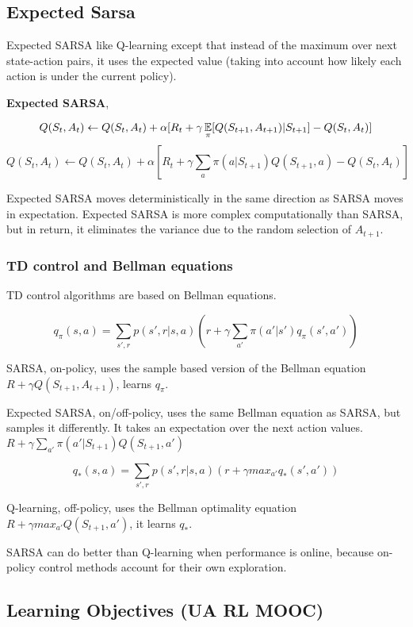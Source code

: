 \documentclass[sutton_barto_notes.tex]{subfiles}
\begin{document}
\subsection{Expected Sarsa}

Expected SARSA like Q-learning except that instead of the maximum over next state-action pairs, it uses the expected value (taking into account how likely each action is under the current policy).

\begin{definition}
\textbf{Expected SARSA},

$$Q(S_t, A_t)\leftarrow Q(S_t, A_t) + \alpha [R_t + \gamma \operatorname*{\mathbb{E}}_\pi [Q(S_{t+1}, A_{t+1})|S_{t+1}] - Q(S_t, A_t)]$$
$$Q(S_t, A_t)\leftarrow Q(S_t, A_t) + \alpha [R_t + \gamma \sum_a \pi(a|S_{t+1})Q(S_{t+1},a) - Q(S_t, A_t)]$$
\end{definition}

Expected SARSA moves deterministically in the same direction as SARSA moves in expectation.
Expected SARSA is more complex computationally than SARSA, but in return, it eliminates the variance due to the random selection of $A_{t+1}$.

\subsubsection{TD control and Bellman equations}

TD control algorithms are based on Bellman equations.

$$q_\pi(s,a) = \sum_{s',r} p(s',r|s,a) (r + \gamma \sum_{a'} \pi(a'|s')q_\pi(s',a'))$$

SARSA, on-policy, uses the sample based version of the Bellman equation $R + \gamma Q(S_{t+1}, A_{t+1})$, learns $q_\pi$.

Expected SARSA, on/off-policy, uses the same Bellman equation as SARSA, but samples it differently. It takes an expectation over the next action values. $R+\gamma\sum_{a'}\pi(a'|S_{t+1})Q(S_{t+1},a')$

$$q_*(s,a) = \sum_{s',r} p(s',r|s,a) (r+\gamma max_{a'} q_* (s',a'))$$

Q-learning, off-policy, uses the Bellman optimality equation $R + \gamma max_{a'} Q(S_{t+1},a')$, it learns $q_*$.

SARSA can do better than Q-learning when performance is online, because on-policy control methods account for their own exploration.

\subsection{Learning Objectives (UA RL MOOC)}
\end{document}
